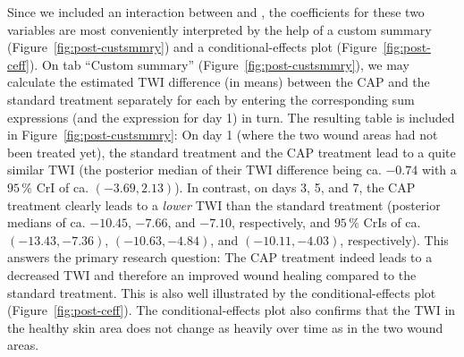 Since we included an interaction between  and , the
coefficients for these two variables are most conveniently interpreted by the
help of a custom summary (Figure~\ref{fig:post-custsmmry}) and a
conditional-effects plot (Figure~\ref{fig:post-ceff}). On tab ``Custom
summary'' (Figure~\ref{fig:post-custsmmry}), we may calculate the estimated TWI
difference (in means) between the CAP and the standard treatment separately
for each  by entering the corresponding sum expressions (and the
expression  for day 1) in turn. The resulting table is included
in Figure~\ref{fig:post-custsmmry}: On day 1 (where the two wound areas had not
been treated yet), the standard treatment and the CAP treatment lead to a
quite similar TWI (the posterior median of their TWI difference being ca.
$-0.74$ with a $95\,\%$ CrI of ca. $(-3.69, 2.13)$). In
contrast, on days 3, 5, and 7, the CAP treatment clearly leads to a
\emph{lower} TWI than the standard treatment (posterior medians of ca.
$-10.45$, $-7.66$, and $-7.10$, respectively, and $95\,\%$ CrIs
of ca. $(-13.43, -7.36)$, $(-10.63, -4.84)$, and $(-10.11, -4.03)$,
respectively). This answers the primary research question: The CAP treatment
indeed leads to a decreased TWI and therefore an improved wound healing
compared to the standard treatment. This is also well illustrated by the
conditional-effects plot (Figure~\ref{fig:post-ceff}). The conditional-effects
plot also confirms that the TWI in the healthy skin area does not change as
heavily over time as in the two wound areas.
